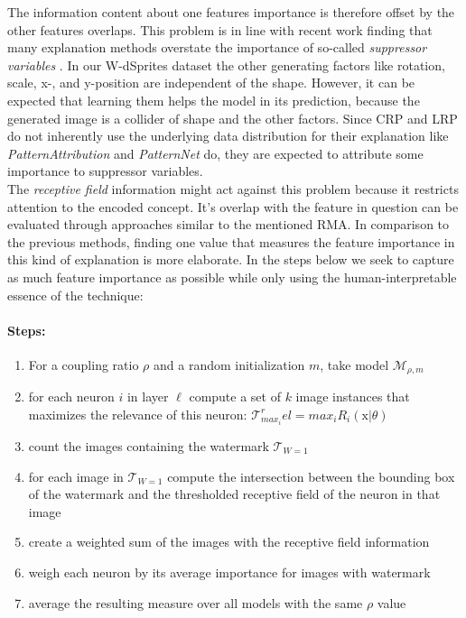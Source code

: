 The information content about one features importance is therefore offset by the other features overlaps. This problem is in line with recent work finding that many explanation methods overstate the importance of so-called \textit{suppressor variables} \cite{Wilming2023,Clark2023}. In our W-dSprites dataset the other generating factors like rotation, scale, x-, and y-position are independent of the shape. However, it can be expected that learning them helps the model in its prediction, because the generated image is a collider of shape and the other factors. Since CRP and LRP do not inherently use the underlying data distribution for their explanation like \textit{PatternAttribution} and \textit{PatternNet} do, they are expected to attribute some importance to suppressor variables. \\

The \textit{receptive field} information might act against this problem because it restricts attention to the encoded concept. It's overlap with the feature in question can be evaluated through approaches similar to the mentioned RMA. 
In comparison to the previous methods, finding one value that measures the feature importance in this kind of explanation is more elaborate. In the steps below we seek to capture as much feature importance as possible while only using the human-interpretable essence of the technique:

\paragraph{Steps:}
\begin{enumerate}
    \item For a coupling ratio $\rho$ and a random initialization $m$, take model $\mathcal{M}_{\rho, m}$
    \item for each neuron $i$ in layer $\ell$ compute a set of $k$ image instances that maximizes the relevance of this neuron: $\mathcal{T}_{max_i}^rel = max_i R_i(\mathrm{x} | \theta)$ 
    \item count the images containing the watermark $\mathcal{T}_{W=1}$
    \item for each image in $\mathcal{T}_{W=1}$ compute the intersection between the bounding box of the watermark and the thresholded receptive field of the neuron in that image
    \item create a weighted sum of the images with the receptive field information
    \item weigh each neuron by its average importance for images with watermark
    \item average the resulting measure over all models with the same $\rho$ value 
\end{enumerate}



